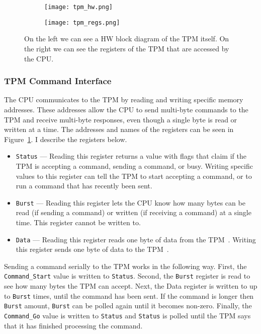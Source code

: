 \documentclass[../report.tex]{subfiles}
\def\code#1{\texttt{#1}}
\begin{document}
\begin{figure}
  \centering
\begin{subfigure}{.4\textwidth}
  \centering
  \texttt{[image: tpm\_hw.png]}
\end{subfigure}
\begin{subfigure}{.40\textwidth}
  \centering
  \texttt{[image: tpm\_regs.png]}
\end{subfigure}
\caption{On the left we can see a HW block diagram of the TPM
itself\cite{tpm-slides}. 
On the right we can see the registers of the TPM that are accessed by the CPU.}
\label{fig:tpm_hw}
\end{figure}


\subsubsection{TPM Command Interface}\label{tpm_cmd_regs}

The CPU communicates to the TPM by reading and writing specific memory addresses.
These addresses allow the CPU to send multi-byte commands to the TPM and receive multi-byte responses, even though a single byte is read or written at a time.
The addresses and names of the registers can be seen in Figure~\ref{fig:tpm_hw}.
I describe the registers below.

\begin{itemize}
    \item \code{Status} --- Reading this register returns a value with flags
        that claim if the TPM is accepting a command, sending a command, or
        busy. Writing specific values to this register can tell the TPM to start
        accepting a command, or to run a command that has recently been sent.
    \item \code{Burst} --- Reading this register lets the CPU know how many
        bytes can be read (if sending a command) or written (if receiving a
        command) at a single time. This register cannot be written to.
    \item \code{Data} --- Reading this register reads one byte of data from the TPM~. Writing this register sends one byte of data to the TPM~.
\end{itemize}

Sending a command serially to the TPM works in the following way.
First, the \code{Command\_Start} value is written to \code{Status}.
Second, the \code{Burst} register is read to see how many bytes the TPM can accept.
Next, the Data register is written to up to \code{Burst} times, until the command has been sent.
If the command is longer then \code{Burst} amount, \code{Burst} can be polled again until it becomes non-zero.
Finally, the \code{Command\_Go} value is written to \code{Status} and \code{Status} is polled until the TPM says that it has finished processing the command.
\end{document}
